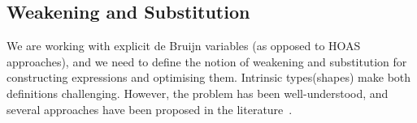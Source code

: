 



\subsection{Weakening and Substitution}
We are working with explicit de Bruijn variables (as opposed to HOAS~\cite{hoas}
approaches), and we need to define the notion of weakening and substitution
for constructing expressions and optimising them.
Intrinsic types(shapes) make both definitions challenging.  However, the problem has
been well-understood, and several approaches have been proposed in the
literature~\cite{subst}.

